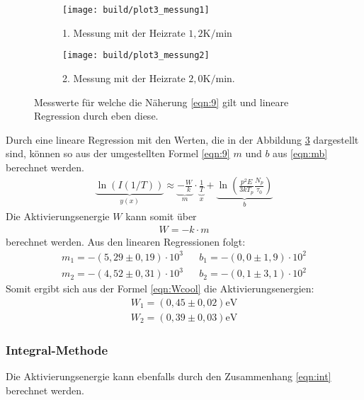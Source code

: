 \begin{figure}
  \centering
  \begin{subfigure}{0.49\textwidth}
    \centering
    \texttt{[image: build/plot3\_messung1]}
    \caption{1. Messung mit der Heizrate $1,2 \si{\kelvin\per\minute}$}
    \label{fig:logfit1}
  \end{subfigure}
  \begin{subfigure}{0.49\textwidth}
    \centering
    \texttt{[image: build/plot3\_messung2]}
    \caption{2. Messung mit der Heizrate $2,0 \si{\kelvin\per\minute}$.}
    \label{fig:logfit2}
  \end{subfigure}
\caption{Messwerte für welche
die Näherung \ref{eqn:9} gilt und lineare Regression durch eben diese.}
\label{fig:logfit}
\end{figure}


Durch eine lineare Regression
mit den Werten, die in der Abbildung \ref{fig:logfit} dargestellt sind, können
so aus der umgestellten Formel \ref{eqn:9}  $m$ und $b$ aus \eqref{eqn:mb} berechnet werden.
\begin{align}
  \underbrace{\ln(I(1/T))}_{y(x)}\approx \underbrace{-\frac{W}{k}}_{m}\cdot \underbrace{\frac1T}_{x}+\underbrace{\ln \left( \frac{p^2E}{3kT_p} \frac{N_p}{\tau_0}\right)}_{b} \label{eqn:mb}
\end{align}
Die Aktivierungsenergie $W$ kann somit über
\begin{align}
  W=-k\cdot m \label{eqn:Wcool}
\end{align}
berechnet werden.
Aus den linearen Regressionen folgt:
\begin{align*}
  m_1=-(5,29\pm0,19)\cdot10^{3}    &  &b_1=-(0,0\pm1,9)\cdot10^{2}\\
  m_2=-(4,52\pm0,31)\cdot10^{3}    &  &b_2=-(0,1\pm3,1)\cdot10^{2}
\end{align*}
Somit ergibt sich aus der Formel \eqref{eqn:Wcool} die Aktivierungsenergien:
\begin{align*}
  W_1=(0,45\pm0,02)\si{\electronvolt}\\
  W_2=(0,39\pm0,03)\si{\electronvolt}
\end{align*}

\subsubsection{Integral-Methode}
\label{sec:integral}
Die Aktivierungsenergie kann ebenfalls durch den Zusammenhang \eqref{eqn:int}
berechnet werden.

